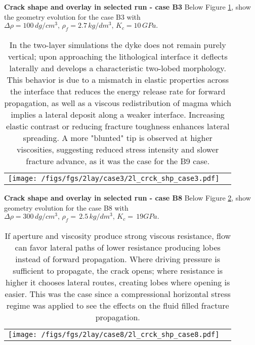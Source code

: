 \documentclass[9pt]{beamer}
\begin{document}
\begin{frame}{\textbf{Crack shape and overlay in selected run - case B3}}
Below Figure \ref{fig:8}, show the geometry evolution for the case B3 with $\Delta \rho =100 \, dg/cm^3, \, \rho_f= 2.7 \, kg/dm^3, \, K_c=10\, GPa.$
\begin{table}
    \centering
    \begin{tabular}{cc}
        \texttt{[image: /figs/fgs/2lay/case3/2l\_crck\_shp\_case3.pdf]}
    \end{tabular}
    \label{fig:8}
  \caption{In the two-layer simulations the dyke does not remain purely vertical; upon approaching the lithological interface it deflects laterally and develops a characteristic two-lobed morphology. This behavior is due to a mismatch in elastic properties across the interface that reduces the energy release rate for forward propagation, as well as a viscous redistribution of magma which implies a lateral deposit along a weaker interface. Increasing elastic contrast or reducing fracture toughness enhances lateral spreading. A more "blunted" tip is observed at higher viscosities, suggesting reduced stress intensity and slower fracture advance, as it was the case for the B9 case. }
\end{table}
\end{frame}

\begin{frame}{\textbf{Crack shape and overlay in selected run - case B8}}
Below Figure \ref{fig:9}, show geometry evolution for the case B8 with $\Delta \rho =300 \, dg/cm^3, \, \rho_f=\, 2.5 \, kg/dm^3, \, K_c=\, 19 GPa.$
\begin{table}
    \centering
    \begin{tabular}{cc}
        \texttt{[image: /figs/fgs/2lay/case8/2l\_crck\_shp\_case8.pdf]}
    \end{tabular}
    \label{fig:9}
  \caption{If aperture and viscosity produce strong viscous resistance, flow can favor lateral paths of lower resistance producing lobes instead of forward propagation. Where driving pressure is sufficient to propagate, the crack opens; where resistance is higher it chooses lateral routes, creating lobes where opening is easier. This was the case since a compressional horizontal stress regime was applied to see the effects on the fluid filled fracture propagation.}
\end{table}
\end{frame}
\end{document}
